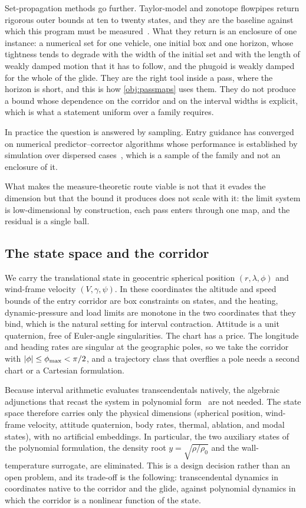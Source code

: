 \documentclass[english,11pt]{extarticle}
\begin{document}
Set-propagation methods go further. Taylor-model and zonotope flowpipes
return rigorous outer bounds at ten to twenty states, and they are the
baseline against which this program must be
measured~\cite{chen2013flowstar,althoff2021set,makino2003taylor}. What they
return is an enclosure of one instance: a numerical set for one vehicle, one
initial box and one horizon, whose tightness tends to degrade with the width
of the initial set and with the length of weakly damped motion that it has
to follow, and the phugoid is weakly damped for the whole of the glide. They
are the right tool inside a pass, where the horizon is short, and this is
how \cref{obj:passmaps} uses them. They do not produce a bound whose
dependence on the corridor and on the interval widths is explicit, which is
what a statement uniform over a family requires.

In practice the question is answered by sampling. Entry guidance has
converged on numerical predictor--corrector algorithms whose performance is
established by simulation over dispersed cases~\cite{lu2014entry}, which is
a sample of the family and not an enclosure of it.

What makes the measure-theoretic route viable is not that it evades the
dimension but that the bound it produces does not scale with it: the limit
system is low-dimensional by construction, each pass enters through one map,
and the residual is a single ball.

\subsection{The state space and the corridor}
We carry the translational state in geocentric spherical position
$(r,\lambda,\phi)$ and wind-frame velocity $(V,\gamma,\psi)$. In these
coordinates the altitude and speed bounds of the entry corridor are box
constraints on states, and the heating, dynamic-pressure and load limits are
monotone in the two coordinates that they bind, which is the natural setting
for interval contraction. Attitude is a unit quaternion, free of Euler-angle
singularities. The chart has a price. The longitude and heading rates are
singular at the geographic poles, so we take the corridor with
$\lvert \phi \rvert\le\phi_{\max}<\pi/2$, and a trajectory class that overflies a
pole needs a second chart or a Cartesian formulation.

Because interval arithmetic evaluates transcendentals natively, the
algebraic adjunctions that recast the system in polynomial
form~\cite{savageau1987recasting} are not needed. The state space
therefore carries only the physical dimensions (spherical position,
wind-frame velocity, attitude quaternion, body rates, thermal, ablation, and
modal states), with no artificial embeddings. In particular, the two
auxiliary states of the polynomial formulation, the density root
$y = \sqrt{\rho/\rho_0}$ and the wall-temperature surrogate, are eliminated.
This is a design decision rather than an open problem, and its trade-off is
the following: transcendental dynamics in coordinates native to the corridor
and the glide, against polynomial dynamics in which the corridor is a
nonlinear function of the state.
\end{document}
